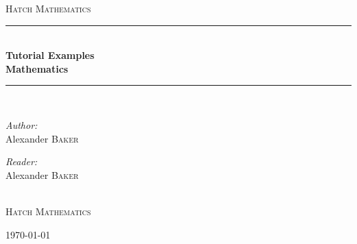 \documentclass[a4paper]{report}
\newcommand{\HRule}{\rule{\linewidth}{0.5mm}}
\begin{document}
\begin{titlepage}

\begin{center}

\textsc{\Large Hatch Mathematics}\\[0.5cm]

\HRule \\[0.4cm]
{\huge \bfseries Tutorial Examples}\\[0.4cm]
{\huge \bfseries Mathematics}\\[0.4cm]
\HRule \\[1.5cm]

\begin{minipage}{0.4\textwidth}
\begin{flushleft} \large
\emph{Author:}\\
Alexander \textsc{Baker}
\end{flushleft}
\end{minipage}
\begin{minipage}{0.5\textwidth}
\begin{flushright} \large
\emph{Reader:} \\
Alexander \textsc{Baker} 

\end{flushright}
\end{minipage}
\\[4cm]
\textsc{\LARGE Hatch Mathematics}\\[1.5cm]

\vfill

{\large \today}

\end{center}

\end{titlepage}

\newpage

\pagestyle{empty} %
\tableofcontents %
\cleardoublepage %
\pagestyle{plain} %
\setcounter{page}{1} %

\newpage


\end{document}

